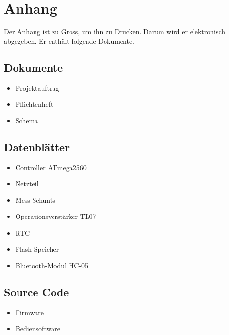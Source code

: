 \pagebreak
\section{Anhang}
Der Anhang ist zu Gross, um ihn zu Drucken. Darum wird er elektronisch abgegeben. Er enthält folgende Dokumente.

\subsection*{Dokumente}
\begin{itemize}
\item Projektauftrag
\item Pflichtenheft
\item Schema
\end{itemize}

\subsection*{Datenblätter}
\begin{itemize}
\item Controller ATmega2560
\item Netzteil 
\item Mess-Schunts
\item Operationsverstärker TL07
\item RTC
\item Flash-Speicher
\item Bluetooth-Modul HC-05
\end{itemize}

\subsection*{Source Code}
\begin{itemize}
\item Firmware
\item Bediensoftware
\end{itemize}

